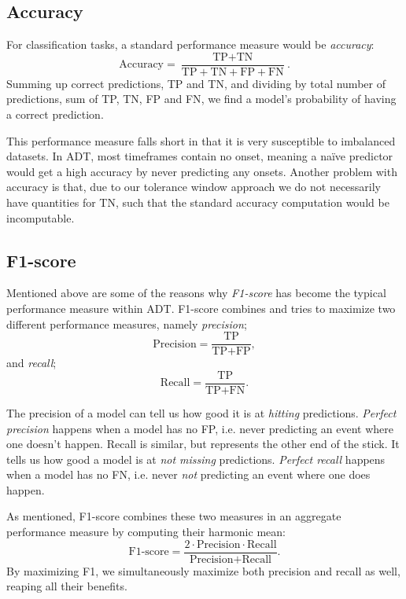 \subsection{Accuracy}

For classification tasks, a standard performance measure would be \textit{accuracy}: \[ \text{Accuracy} = \frac{\text{TP} + \text{TN}}{\text{TP} + \text{TN} + \text{FP} + \text{FN}}.\] Summing up correct predictions, \gls{TP} and \gls{TN}, and dividing by total number of predictions, sum of \gls{TP}, \gls{TN}, \gls{FP} and \gls{FN}, we find a model's probability of having a correct prediction.

This performance measure falls short in that it is very susceptible to imbalanced datasets. In \gls{ADT}, most timeframes contain no onset, meaning a naïve predictor would get a high accuracy by never predicting any onsets. Another problem with accuracy is that, due to our tolerance window approach we do not necessarily have quantities for \gls{TN}, such that the standard accuracy computation would be incomputable.

\subsection{F1-score}

Mentioned above are some of the reasons why \textit{F1-score} has become the typical performance measure within \gls{ADT}. F1-score combines and tries to maximize two different performance measures, namely \textit{precision}; \[ \text{Precision} = \frac{\text{TP}}{\text{TP} + \text{FP}}, \] and \textit{recall}; \[ \text{Recall} = \frac{\text{TP}}{\text{TP} + \text{FN}}. \]

The precision of a model can tell us how good it is at \textit{hitting} predictions. \textit{Perfect precision} happens when a model has no \gls{FP}, i.e. never predicting an event where one doesn't happen. Recall is similar, but represents the other end of the stick. It tells us how good a model is at \textit{not missing} predictions. \textit{Perfect recall} happens when a model has no \gls{FN}, i.e. never \textit{not} predicting an event where one does happen.

As mentioned, F1-score combines these two measures in an aggregate performance measure by computing their harmonic mean: $$ \text{F1-score} = \frac{2 \cdot \text{Precision} \cdot \text{Recall}}{\text{Precision} + \text{Recall}}. $$ By maximizing F1, we simultaneously maximize both precision and recall as well, reaping all their benefits.

